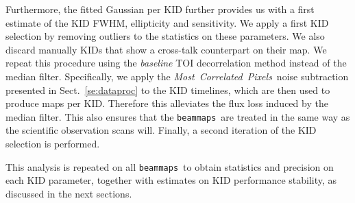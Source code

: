 \documentclass[traditionalabstract]{aa}
\newcommand{\bms}{{\tt beammaps}}
\newcommand{\cmoneb}{\emph{Most~Correlated~Pixels}}
\newcommand{\lp}[1]{#1}
\newcommand{\rev}[1]{#1}
\begin{document}
{\lp Furthermore, the fitted Gaussian per KID further provides us with
a first estimate of the KID FWHM, ellipticity and sensitivity. 
We apply a first KID selection by removing outliers to the statistics
on these parameters. We also discard manually KIDs that show a
cross-talk counterpart on their map. We repeat this
procedure using the \emph{baseline} TOI decorrelation method instead of the
median filter. Specifically, we apply the \cmoneb\ noise subtraction
presented in Sect.~\ref{se:dataproc} to the KID timelines, which are
then used to produce maps per KID. Therefore this alleviates the flux loss
induced by the median filter.}
{\rev This also ensures that the \bms\ are treated in the same way as
the scientific observation scans will.} Finally, a second iteration of
the KID selection is performed.

This analysis is repeated on all \bms\ to obtain statistics and
precision on each KID parameter, together with estimates on KID
performance stability, as discussed in the next sections.
\end{document}
